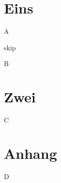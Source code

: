 \documentclass{article}
\begin{document}
\section{Eins}
\begin{satz}\label{s:a} A \end{satz}
\begin{remark} skip \end{remark}
\begin{kor} B \end{kor}
\section{Zwei}
\begin{satz} C \end{satz}
\appendix
\section{Anhang}
\begin{satz} D \end{satz}
\end{document}
